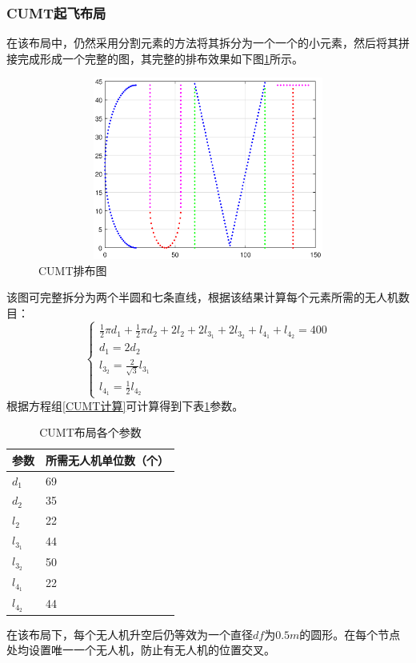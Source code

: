 \documentclass[UTF8,12pt]{ctexart}
\begin{document}
\subsubsection{CUMT起飞布局}
在该布局中，仍然采用分割元素的方法将其拆分为一个一个的小元素，然后将其拼接完成形成一个完整的图，其完整的排布效果如下图\ref{CUMT排布}所示。
\begin{figure}[htbp]
    \centering
    \includegraphics[height=6.0cm,width=12.0cm]{img/draw_cumt.eps}
    \caption{CUMT排布图}
    \label{CUMT排布}
\end{figure}
该图可完整拆分为两个半圆和七条直线，根据该结果计算每个元素所需的无人机数目：
\begin{equation}
    \label{CUMT计算}
    \left\{
        \begin{array}{c}
            \frac{1}{2}\pi d_1 + \frac{1}{2}\pi d_2 + 2l_2 + 2l_{3_1} + 2l_{3_2} + l_{4_1} + l_{4_2}=400 \\
            d_1=2d_2\\
            l_{3_2}=\frac{2}{\sqrt{3}}l_{3_1}\\
            l_{4_1}=\frac{1}{2}l_{4_2}
        \end{array}
        \right.
\end{equation}
根据方程组\eqref{CUMT计算}可计算得到下表\ref{CUMT布局表}参数。
\begin{table}
    \centering
    \vspace{20pt}
    \caption{CUMT布局各个参数}
    \begin{tabular}{p{2cm}p{5cm}}
        \hline
        参数    &   所需无人机单位数（个）\\
        \hline
        $d_1$   &   69\\
        $d_2$   &   35\\
        $l_2$   &   22\\
        $l_{3_1}$   &   44\\
        $l_{3_2}$   &   50\\
        $l_{4_1}$   &   22\\
        $l_{4_2}$   &   44\\
        \hline
    \end{tabular}
    \label{CUMT布局表}
\end{table}
在该布局下，每个无人机升空后仍等效为一个直径$df$为$0.5m$的圆形。在每个节点处均设置唯一一个无人机，防止有无人机的位置交叉。
\end{document}
